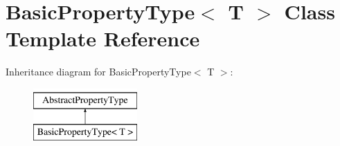 \hypertarget{classBasicPropertyType}{\section{Basic\-Property\-Type$<$ T $>$ Class Template Reference}
\label{classBasicPropertyType}
}
Inheritance diagram for Basic\-Property\-Type$<$ T $>$\-:\begin{figure}[H]
\begin{center}
\leavevmode
\includegraphics[height=2.000000cm]{classBasicPropertyType}
\end{center}
\end{figure}

